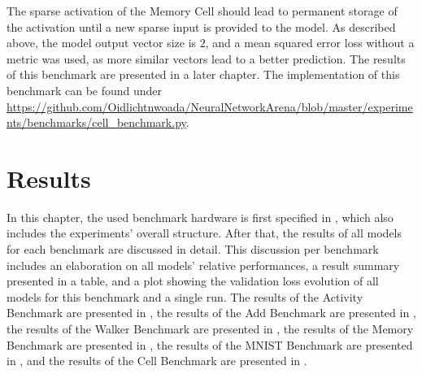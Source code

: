 \documentclass[draft,final]{vutinfth} %
\begin{document}
    The sparse activation of the Memory Cell should lead to permanent storage of the activation until a new sparse input is provided to the model.
    As described above, the model output vector size is $2$, and a mean squared error loss without a metric was used, as more similar vectors lead to a better prediction.
    The results of this benchmark are presented in a later chapter.
    The implementation of this benchmark can be found under \url{https://github.com/Oidlichtnwoada/NeuralNetworkArena/blob/master/experiments/benchmarks/cell_benchmark.py}.


    \chapter{Results} \label{chapter_results}
    In this chapter, the used benchmark hardware is first specified in , which also includes the experiments' overall structure.
    After that, the results of all models for each benchmark are discussed in detail.
    This discussion per benchmark includes an elaboration on all models' relative performances, a result summary presented in a table, and a plot showing the validation loss evolution of all models for this benchmark and a single run.
    The results of the Activity Benchmark are presented in , the results of the Add Benchmark are presented in , the results of the Walker Benchmark are presented in , the results of the Memory Benchmark are presented in , the results of the MNIST Benchmark are presented in , and the results of the Cell Benchmark are presented in .
\end{document}
